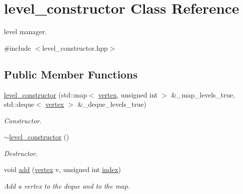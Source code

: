 \hypertarget{classlevel__constructor}{}\section{level\+\_\+constructor Class Reference}
\label{classlevel__constructor}


level manager.  




{\ttfamily \#include $<$level\+\_\+constructor.\+hpp$>$}

\subsection*{Public Member Functions}
\begin{DoxyCompactItemize}
\item 
\hyperlink{classlevel__constructor_af87499ee57672a337d8cb6e4261d5a47}{level\+\_\+constructor} (std\+::map$<$ \hyperlink{graph_8hpp_abefdcf0544e601805af44eca032cca14}{vertex}, unsigned int $>$ \&\+\_\+map\+\_\+levels\+\_\+true, std\+::deque$<$ \hyperlink{graph_8hpp_abefdcf0544e601805af44eca032cca14}{vertex} $>$ \&\+\_\+deque\+\_\+levels\+\_\+true)
\begin{DoxyCompactList}\small\item\em Constructor. \end{DoxyCompactList}\item 
\hyperlink{classlevel__constructor_aa52e6e3db284b6d0ca193cf60afb0aae}{$\sim$level\+\_\+constructor} ()
\begin{DoxyCompactList}\small\item\em Destructor. \end{DoxyCompactList}\item 
void \hyperlink{classlevel__constructor_a5924f498057639989eab3c8be3e562de}{add} (\hyperlink{graph_8hpp_abefdcf0544e601805af44eca032cca14}{vertex} v, unsigned int \hyperlink{tutorial__pact__2019_2Introduction_2third_2include_2Keccak_8h_a028c9bdc8344cca38ab522a337074797}{index})
\begin{DoxyCompactList}\small\item\em Add a vertex to the deque and to the map. \end{DoxyCompactList}\end{DoxyCompactItemize}
